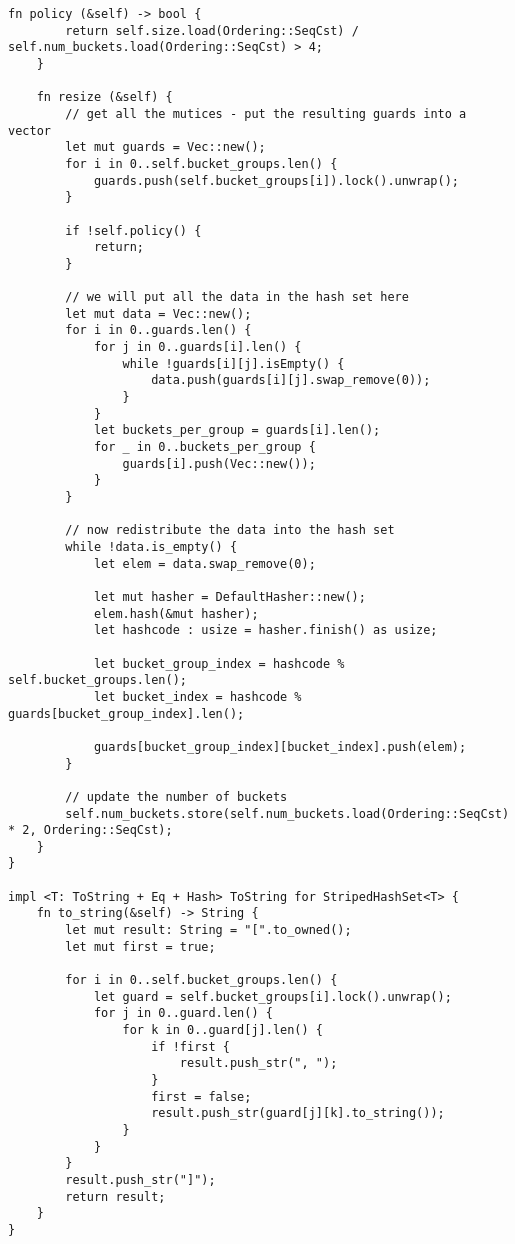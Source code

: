 \documentclass[twocolumn,landscape,10pt]{article}
\theoremstyle{definition}
\begin{document}
\begin{lstlisting}[Rust]
    fn policy (&self) -> bool {
        return self.size.load(Ordering::SeqCst) / self.num_buckets.load(Ordering::SeqCst) > 4;
    }

    fn resize (&self) {
        // get all the mutices - put the resulting guards into a vector
        let mut guards = Vec::new();
        for i in 0..self.bucket_groups.len() {
            guards.push(self.bucket_groups[i]).lock().unwrap();
        }

        if !self.policy() {
            return;
        }

        // we will put all the data in the hash set here
        let mut data = Vec::new(); 
        for i in 0..guards.len() {
            for j in 0..guards[i].len() {
                while !guards[i][j].isEmpty() {
                    data.push(guards[i][j].swap_remove(0));
                }
            }
            let buckets_per_group = guards[i].len();
            for _ in 0..buckets_per_group {
                guards[i].push(Vec::new());
            }
        }

        // now redistribute the data into the hash set
        while !data.is_empty() {
            let elem = data.swap_remove(0);

            let mut hasher = DefaultHasher::new();
            elem.hash(&mut hasher);
            let hashcode : usize = hasher.finish() as usize;

            let bucket_group_index = hashcode % self.bucket_groups.len();
            let bucket_index = hashcode % guards[bucket_group_index].len();

            guards[bucket_group_index][bucket_index].push(elem);
        }

        // update the number of buckets
        self.num_buckets.store(self.num_buckets.load(Ordering::SeqCst) * 2, Ordering::SeqCst);
    }
}

impl <T: ToString + Eq + Hash> ToString for StripedHashSet<T> {
    fn to_string(&self) -> String {
        let mut result: String = "[".to_owned();
        let mut first = true;

        for i in 0..self.bucket_groups.len() {
            let guard = self.bucket_groups[i].lock().unwrap();
            for j in 0..guard.len() {
                for k in 0..guard[j].len() {
                    if !first {
                        result.push_str(", ");
                    }
                    first = false;
                    result.push_str(guard[j][k].to_string());
                }
            }
        }
        result.push_str("]");
        return result;
    }
}
\end{lstlisting}
\end{document}
